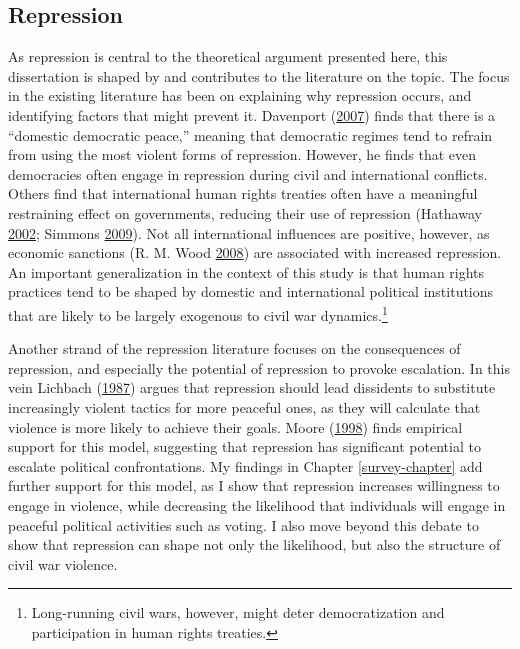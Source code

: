 \documentclass[12pt,]{book}
\let\rmarkdownfootnote\footnote%
\def\footnote{\protect\rmarkdownfootnote}
\theoremstyle{definition}
\theoremstyle{definition}
\theoremstyle{remark}
\begin{document}
\subsection{Repression}\label{repression}

As repression is central to the theoretical argument presented here,
this dissertation is shaped by and contributes to the literature on the
topic. The focus in the existing literature has been on explaining why
repression occurs, and identifying factors that might prevent it.
Davenport (\protect\hyperlink{ref-Davenport2007a}{2007}) finds that
there is a ``domestic democratic peace,'' meaning that democratic
regimes tend to refrain from using the most violent forms of repression.
However, he finds that even democracies often engage in repression
during civil and international conflicts. Others find that international
human rights treaties often have a meaningful restraining effect on
governments, reducing their use of repression (Hathaway
\protect\hyperlink{ref-Hathaway2002}{2002}; Simmons
\protect\hyperlink{ref-simmons09}{2009}). Not all international
influences are positive, however, as economic sanctions (R. M. Wood
\protect\hyperlink{ref-Wood2008a}{2008}) are associated with increased
repression. An important generalization in the context of this study is
that human rights practices tend to be shaped by domestic and
international political institutions that are likely to be largely
exogenous to civil war dynamics.\footnote{Long-running civil wars,
  however, might deter democratization and participation in human rights
  treaties.}

Another strand of the repression literature focuses on the consequences
of repression, and especially the potential of repression to provoke
escalation. In this vein Lichbach
(\protect\hyperlink{ref-Lichbach1987}{1987}) argues that repression
should lead dissidents to substitute increasingly violent tactics for
more peaceful ones, as they will calculate that violence is more likely
to achieve their goals. Moore (\protect\hyperlink{ref-Moore1998}{1998})
finds empirical support for this model, suggesting that repression has
significant potential to escalate political confrontations. My findings
in Chapter \ref{survey-chapter} add further support for this model, as I
show that repression increases willingness to engage in violence, while
decreasing the likelihood that individuals will engage in peaceful
political activities such as voting. I also move beyond this debate to
show that repression can shape not only the likelihood, but also the
structure of civil war violence.
\end{document}
